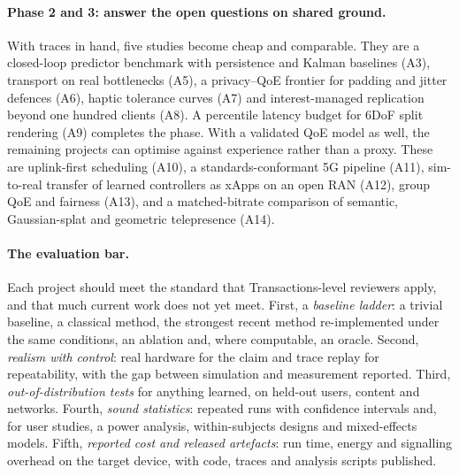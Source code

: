 \paragraph{Phase 2 and 3: answer the open questions on shared ground.} With traces in hand, five
studies become cheap and comparable. They are a closed-loop predictor benchmark with persistence and
Kalman baselines (A3), transport on real bottlenecks (A5), a privacy--QoE frontier for padding and jitter
defences (A6), haptic tolerance curves (A7) and interest-managed replication beyond one hundred clients
(A8). A percentile latency budget for 6DoF split rendering (A9) completes the phase. With a validated QoE
model as well, the remaining projects can optimise against experience rather than a proxy. These are
uplink-first scheduling (A10), a standards-conformant 5G pipeline (A11), sim-to-real transfer of learned
controllers as xApps on an open RAN (A12), group QoE and fairness (A13), and a matched-bitrate comparison
of semantic, Gaussian-splat and geometric telepresence (A14).

\paragraph{The evaluation bar.} Each project should meet the standard that Transactions-level reviewers
apply, and that much current work does not yet meet. First, a \emph{baseline ladder}: a trivial baseline,
a classical method, the strongest recent method re-implemented under the same conditions, an ablation
and, where computable, an oracle. Second, \emph{realism with control}: real hardware for the claim and
trace replay for repeatability, with the gap between simulation and measurement reported. Third,
\emph{out-of-distribution tests} for anything learned, on held-out users, content and networks. Fourth,
\emph{sound statistics}: repeated runs with confidence intervals and, for user studies, a power analysis,
within-subjects designs and mixed-effects models. Fifth, \emph{reported cost and released artefacts}: run
time, energy and signalling overhead on the target device, with code, traces and analysis scripts
published.
